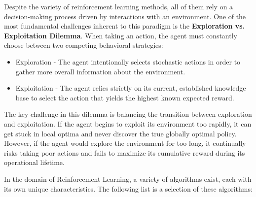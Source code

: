 
Despite the variety of reinforcement learning methods, all of them rely on a decision-making process driven by interactions with an environment. One of the most fundamental challenges inherent to this paradigm is the \textbf{Exploration vs. Exploitation Dilemma}.
When taking an action, the agent must constantly choose between two competing behavioral strategies:
\begin{itemize}
	\item Exploration - The agent intentionally selects stochastic actions in order to gather more overall information about the environment.
	\item Exploitation - The agent relies strictly on its current, established knowledge base to select the action that yields the highest known expected reward.
\end{itemize}
The key challenge in this dilemma is balancing the transition between exploration and exploitation. If the agent begins to exploit its environment too rapidly, it can get stuck in local optima and never discover the true globally optimal policy. However, if the agent would explore the environment for too long, it continually risks taking poor actions and fails to maximize its cumulative reward during its operational lifetime.



 In the domain of Reinforcement Learning, a variety of algorithms exist, each with its own unique characteristics. The following list is a selection of these algorithms:

